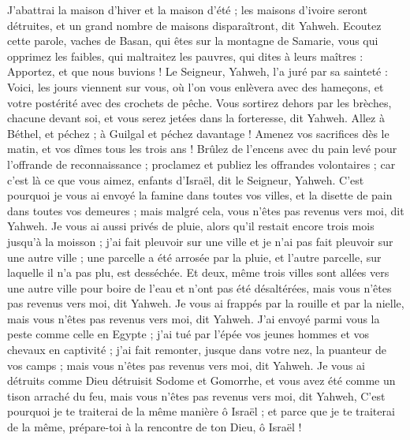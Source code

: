 \begin{multicols}{2}
J’abattrai la maison d'hiver et la maison d'été ; les maisons d'ivoire seront détruites, et un grand nombre de maisons disparaîtront, dit Yahweh.
\VerseOne{}Ecoutez cette parole, vaches de Basan, qui êtes sur la montagne de Samarie, vous qui opprimez les faibles, qui maltraitez les pauvres, qui dites à leurs maîtres : Apportez, et que nous buvions !
Le Seigneur, Yahweh, l’a juré par sa sainteté : Voici, les jours viennent sur vous, où l’on vous enlèvera avec des hameçons, et votre postérité avec des crochets de pêche.
Vous sortirez dehors par les brèches, chacune devant soi, et vous serez jetées dans la forteresse, dit Yahweh.
Allez à Béthel, et péchez ; à Guilgal et péchez davantage ! Amenez vos sacrifices dès le matin, et vos dîmes tous les trois ans !
Brûlez de l’encens avec du pain levé pour l’offrande de reconnaissance ; proclamez et publiez les offrandes volontaires ; car c’est là ce que vous aimez, enfants d'Israël, dit le Seigneur, Yahweh.
C'est pourquoi je vous ai envoyé la famine dans toutes vos villes, et la disette de pain dans toutes vos demeures ; mais malgré cela, vous n’êtes pas revenus vers moi, dit Yahweh.
Je vous ai aussi privés de pluie, alors qu’il restait encore trois mois jusqu'à la moisson ; j'ai fait pleuvoir sur une ville et je n'ai pas fait pleuvoir sur une autre ville ; une parcelle a été arrosée par la pluie, et l'autre parcelle, sur laquelle il n'a pas plu, est desséchée.
Et deux, même trois villes sont allées vers une autre ville pour boire de l'eau et n'ont pas été désaltérées, mais vous n’êtes pas revenus vers moi, dit Yahweh.
Je vous ai frappés par la rouille et par la nielle, mais vous n’êtes pas revenus vers moi, dit Yahweh.
J’ai envoyé parmi vous la peste comme celle en Egypte ; j'ai tué par l'épée vos jeunes hommes et vos chevaux en captivité ; j'ai fait remonter, jusque dans votre nez, la puanteur de vos camps ; mais vous n’êtes pas revenus vers moi, dit Yahweh.
Je vous ai détruits comme Dieu détruisit Sodome et Gomorrhe, et vous avez été comme un tison arraché du feu, mais vous n’êtes pas revenus vers moi, dit Yahweh,
C'est pourquoi je te traiterai de la même manière ô Israël ; et parce que je te traiterai de la même, prépare-toi à la rencontre de ton Dieu, ô Israël !

\end{multicols}
